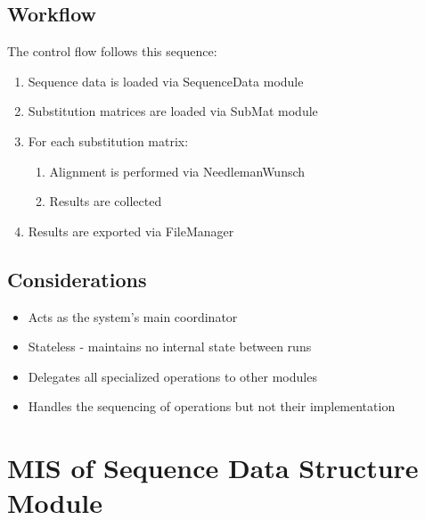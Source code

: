 \documentclass[12pt, titlepage]{article}
\begin{document}
\subsection{Workflow}

The control flow follows this sequence:

\begin{enumerate}
    \item Sequence data is loaded via SequenceData module
    \item Substitution matrices are loaded via SubMat module
    \item For each substitution matrix:
    \begin{enumerate}
        \item Alignment is performed via NeedlemanWunsch
        \item Results are collected
    \end{enumerate}
    \item Results are exported via FileManager
\end{enumerate}


\subsection{Considerations}

\begin{itemize}
    \item Acts as the system's main coordinator
    \item Stateless - maintains no internal state between runs
    \item Delegates all specialized operations to other modules
    \item Handles the sequencing of operations but not their implementation
\end{itemize}


\newpage

\section{MIS of Sequence Data Structure Module} \label{mSDS}
\end{document}
